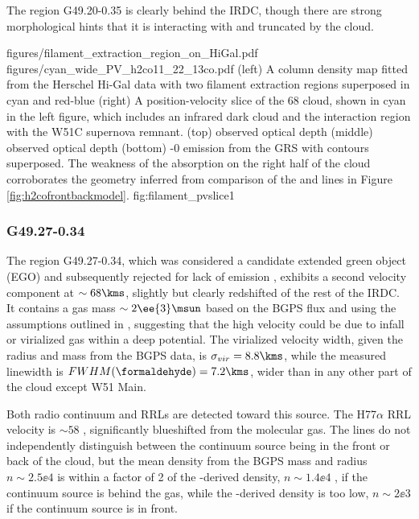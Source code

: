 The \hii region G49.20-0.35 is clearly behind the IRDC, though there are strong
morphological hints that it is interacting with and truncated by the cloud.

\FigureTwo
{figures/filament_extraction_region_on_HiGal.pdf}
{figures/cyan_wide_PV_h2co11_22_13co.pdf}
{(left) A column density map fitted from the Herschel Hi-Gal data with two filament extraction regions superposed
in cyan and red-blue
(right) A position-velocity slice of the 68 \kms cloud, shown in cyan in the
left figure, which includes an infrared dark cloud and the interaction region
with the W51C supernova remnant.
(top) \formaldehyde \oneone observed optical depth
(middle) \formaldehyde \twotwo observed optical depth
(bottom) -0 emission from the GRS with \formaldehyde \oneone
contours superposed.  The weakness of the \formaldehyde absorption on the right
half of the cloud corroborates the geometry inferred from comparison of the \oneone
and \twotwo lines in Figure \ref{fig:h2cofrontbackmodel}.}
{fig:filament_pvslice}{1}%

\subsubsection{G49.27-0.34}
The \uchii region G49.27-0.34, which was considered a candidate extended green
object (EGO) and subsequently rejected for lack of \hh emission
\citep{De-Buizer2010a,Lee2013a}, exhibits a second velocity component at $\sim68
\kms$, slightly but clearly redshifted of the rest of the IRDC.  It contains a
gas mass $\sim2\ee{3} \msun$ based on the BGPS flux and using the assumptions
outlined in \citet{Aguirre2011a}, suggesting that the high velocity could be
due to infall or virialized gas within a deep potential.  The virialized
velocity width, given the radius and mass from the BGPS data, is
$\sigma_{vir}=8.8 \kms$, while the measured \formaldehyde linewidth is
$FWHM(\formaldehyde) = 7.2 \kms$, wider than in any other part of the cloud
except W51 Main.

Both radio continuum and RRLs are detected toward this source.  The H77$\alpha$
RRL velocity is $\sim58$ \kms, significantly blueshifted from the molecular
gas.  The \formaldehyde lines do not independently distinguish between the
continuum source being in the front or back of the cloud, but the mean density
from the BGPS mass and radius $n\sim2.5\ee{4}$ \percc is within a factor of 2
of the \formaldehyde-derived density, $n\sim1.4\ee{4}$ \percc, if the continuum
source is behind the gas, while the \formaldehyde-derived density is too low,
$n\sim2\ee{3}$ \percc if the continuum source is in front.

